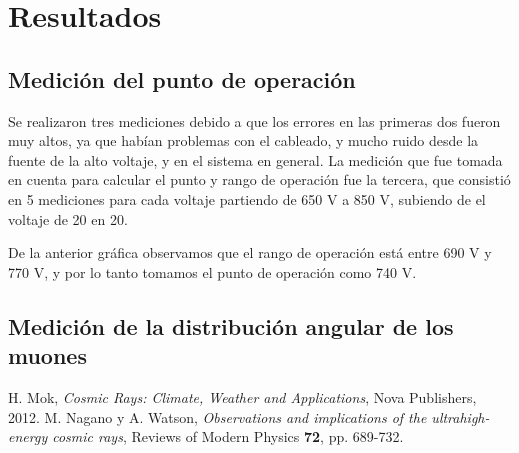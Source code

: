 \documentclass[a4paper,10pt]{article}
\numberwithin{equation}{section}
\begin{document}
\section{Resultados}

\subsection{Medición del punto de operación}

Se realizaron tres mediciones debido a que los errores en las primeras dos fueron muy altos, 
ya que habían problemas con el cableado, y mucho ruido desde la fuente de la alto voltaje,
y en el sistema en general. La medición que fue tomada en cuenta para calcular el 
punto y rango de operación fue la tercera, que consistió en 5 mediciones para cada voltaje 
partiendo de 650 V a 850 V, subiendo de el voltaje de 20 en 20. 


\begin{table}[H]
\centering
\caption{Mediciones a distintos voltajes para el flujo de muones}
\label{my-label}
\end{table}

De la anterior gráfica observamos que el rango de operación está entre 690 V y 770 V,
y por lo tanto tomamos el punto de operación como 740 V. 

\subsection{Medición de la distribución angular de los muones}

\begin{thebibliography}{10}
H. Mok, \emph{Cosmic Rays: Climate, Weather and Applications}, Nova Publishers, 
2012.
M. Nagano y A. Watson, \emph{Observations and implications of the ultrahigh-energy 
cosmic rays}, Reviews of Modern Physics \textbf{72}, pp. 689-732.
\end{thebibliography}
\end{document}
